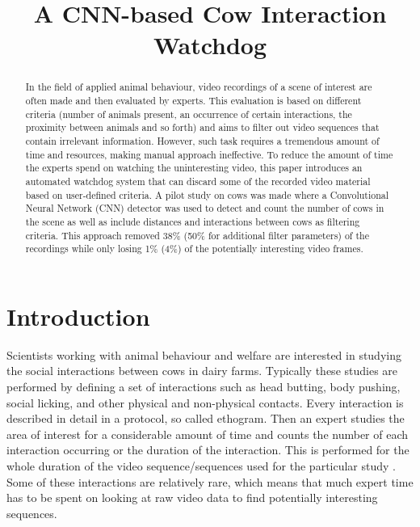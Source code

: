 \documentclass{cta-author}
\begin{document}
\title{A CNN-based Cow Interaction Watchdog}

\author{   }
\address{
}


\begin{abstract}
In the field of applied animal behaviour, video recordings of a scene of interest are often made and then
evaluated by experts. This evaluation is based on different criteria (number of animals present, an
occurrence of certain interactions, the proximity between animals and so forth) and aims to filter out video
sequences that contain irrelevant information.  However,  such task requires a tremendous amount of time and
resources, making manual approach ineffective. To reduce the amount of time the experts spend on watching the
uninteresting video, this paper introduces an automated watchdog system that can discard some of the recorded
video material based on user-defined criteria. A pilot study on cows was made where a Convolutional Neural
Network (CNN) detector was used to detect and count the number of cows in the scene as well as include
distances and interactions between cows as filtering criteria. This approach removed 38\% (50\% for
additional filter parameters) of the recordings while only losing 1\% (4\%) of the potentially interesting
video frames.
\end{abstract}

\maketitle

\section{Introduction}

Scientists working with animal behaviour and welfare are interested in studying the social interactions
between cows in dairy farms. Typically these studies are performed by defining a set of interactions such as
head butting, body pushing, social licking, and other physical and non-physical contacts. Every interaction
is described in detail in a protocol, so called ethogram. Then an expert studies the area of interest for a considerable amount
of time and counts the number of each interaction occurring or the duration of the interaction. This is
performed for the whole duration of the video sequence/sequences used for the particular study
\cite{MartinandBateson2007}. Some of these interactions are relatively rare, which means that much expert
time has to be spent on looking at raw video data to find potentially interesting sequences.
\end{document}
